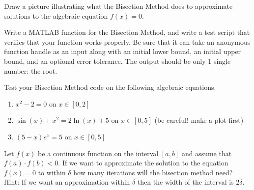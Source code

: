 \begin{problem}
    Draw a picture illustrating what the Bisection Method does to approximate solutions to
    the algebraic equation $f(x) = 0$.
\end{problem}


\begin{problem}
    Write a MATLAB function for the Bisection Method, and write a test script
   that verifies that your function works properly. Be sure that it can take an
    anonymous function handle as an input along with an initial lower bound, an initial
    upper bound, and an optional error tolerance. The output should be only 1 single number: the
    root.\\
\end{problem}

\begin{problem}
    Test your Bisection Method code on the following algebraic equations.
    \begin{enumerate}
        \item $x^2 - 2 = 0$ on $x \in [0,2]$ 
        \item $\sin(x) + x^2 = 2\ln(x) + 5$ on $x \in [0,5]$ (be careful! make a plot
            first) 
        \item $(5-x)e^{x}=5$ on $x \in [0,5]$
    \end{enumerate}
\end{problem}


\begin{problem}
    Let $f(x)$ be a continuous function on the interval $[a,b]$ and assume that $f(a)
    \cdot f(b) <0$.  If we want to approximate the solution to the equation $f(x)=0$ to
    within $\delta$ how many iterations will the bisection method need? \\ Hint: If we
    want an approximation within $\delta$ then the width of the interval is $2\delta$.
\end{problem}


